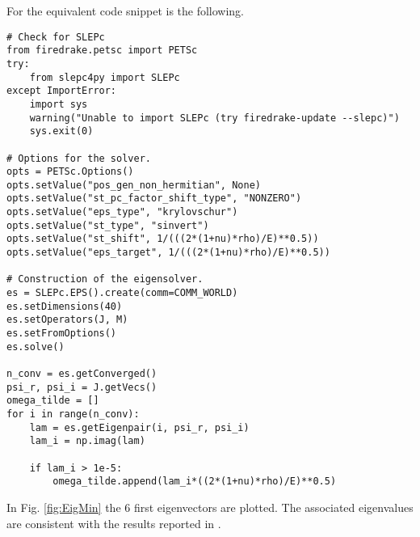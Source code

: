  For \firedrake the equivalent code snippet is the following.
\begin{tcolorbox}[title = Eigenvalues computation in  \firedrake, coltitle=black, breakable, size=fbox, boxrule=1pt, pad at break*=1mm, colframe=cyan, enlarge top by=0.25em, enlarge bottom by=0.5em]
\begin{Verbatim}[tabsize=4]
# Check for SLEPc
from firedrake.petsc import PETSc
try:
	from slepc4py import SLEPc
except ImportError:
	import sys
	warning("Unable to import SLEPc (try firedrake-update --slepc)")
	sys.exit(0)
	
# Options for the solver.
opts = PETSc.Options()
opts.setValue("pos_gen_non_hermitian", None)
opts.setValue("st_pc_factor_shift_type", "NONZERO")
opts.setValue("eps_type", "krylovschur")
opts.setValue("st_type", "sinvert")
opts.setValue("st_shift", 1/(((2*(1+nu)*rho)/E)**0.5))
opts.setValue("eps_target", 1/(((2*(1+nu)*rho)/E)**0.5))

# Construction of the eigensolver.
es = SLEPc.EPS().create(comm=COMM_WORLD)
es.setDimensions(40)
es.setOperators(J, M)
es.setFromOptions()
es.solve()

n_conv = es.getConverged()
psi_r, psi_i = J.getVecs()
omega_tilde = []
for i in range(n_conv):
	lam = es.getEigenpair(i, psi_r, psi_i)
	lam_i = np.imag(lam)
	
	if lam_i > 1e-5:
		omega_tilde.append(lam_i*((2*(1+nu)*rho)/E)**0.5)
\end{Verbatim}
\end{tcolorbox}

In Fig. \ref{fig:EigMin} the 6 first eigenvectors are plotted. The associated eigenvalues are consistent with the results reported in \cite{dawe1980rayleigh}. 

\begin{figure*}[hp]
	\centering
	\hfil
	 \\
	\hfil
	 \\
	\hfil
	\caption{Eigenvectors for the clamped Mindlin plate computed with \firedrake. The eigenfrequencies are normalized $\widetilde{\omega} = \omega((2(1+\nu)\rho/E)^{1/2}$. The results are consistent with \cite{dawe1980rayleigh}.}
	\label{fig:EigMin}
\end{figure*}



